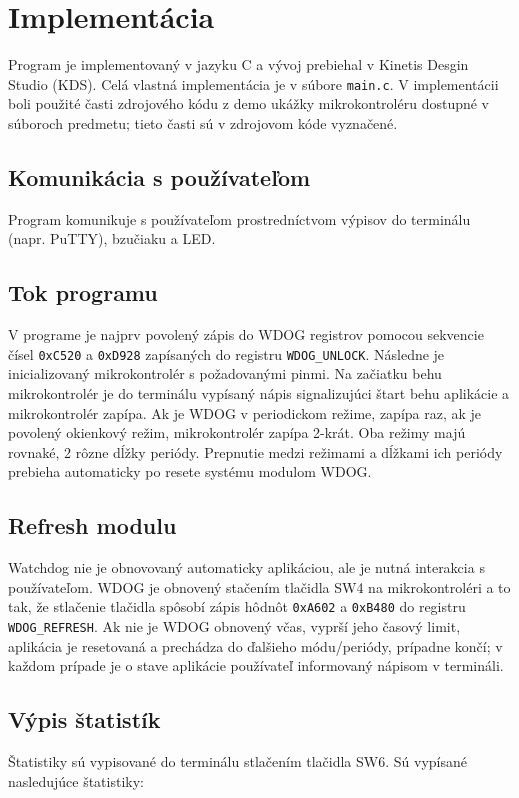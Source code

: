 \documentclass[12pt,a4paper,titlepage,final]{article}
\begin{document}
\section{Implementácia}
Program je implementovaný v jazyku C a vývoj prebiehal v Kinetis Desgin Studio (KDS). Celá vlastná implementácia je v súbore \verb|main.c|. V implementácii boli použité časti zdrojového kódu z demo ukážky mikrokontroléru dostupné v súboroch predmetu; tieto časti sú v zdrojovom kóde vyznačené.

\subsection{Komunikácia s používateľom}
Program komunikuje s používateľom prostredníctvom výpisov do terminálu (napr. PuTTY), bzučiaku a LED.

\subsection{Tok programu}
V programe je najprv povolený zápis do WDOG registrov pomocou sekvencie čísel \verb|0xC520| a \verb|0xD928| zapísaných do registru \verb|WDOG_UNLOCK|. Následne je inicializovaný mikrokontrolér s požadovanými pinmi. Na začiatku behu mikrokontrolér je do terminálu vypísaný nápis signalizujúci štart behu aplikácie a mikrokontrolér zapípa. Ak je WDOG v periodickom režime, zapípa raz, ak je povolený okienkový režim, mikrokontrolér zapípa 2-krát. Oba režimy majú rovnaké, 2 rôzne dĺžky periódy. Prepnutie medzi režimami a dĺžkami ich periódy prebieha automaticky po resete systému modulom WDOG.

\subsection{Refresh modulu}
Watchdog nie je obnovovaný automaticky aplikáciou, ale je nutná interakcia s používateľom. WDOG je obnovený stačením tlačidla SW4 na mikrokontroléri a to tak, že stlačenie tlačidla spôsobí zápis hôdnôt \verb|0xA602| a \verb|0xB480| do registru \verb|WDOG_REFRESH|. Ak nie je WDOG obnovený včas, vyprší jeho časový limit, aplikácia je resetovaná a prechádza do ďalšieho módu/periódy, prípadne končí; v každom prípade je o stave aplikácie používateľ informovaný nápisom v termináli.

\subsection{Výpis štatistík}
Štatistiky sú vypisované do terminálu stlačením tlačidla SW6. Sú vypísané nasledujúce štatistiky:
\end{document}
